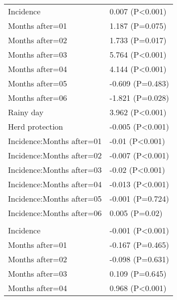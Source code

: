 \documentclass[]{article}
\begin{document}
\begin{longtable}[t]{ll}
\hspace{1em}Incidence & 0.007 (P<0.001)\\
\hspace{1em}Months after=01 & 1.187 (P=0.075)\\
\hspace{1em}Months after=02 & 1.733 (P=0.017)\\
\hspace{1em}Months after=03 & 5.764 (P<0.001)\\
\hspace{1em}Months after=04 & 4.144 (P<0.001)\\
\hspace{1em}Months after=05 & -0.609 (P=0.483)\\
\hspace{1em}Months after=06 & -1.821 (P=0.028)\\
\hspace{1em}Rainy day & 3.962 (P<0.001)\\
\hspace{1em}Herd protection & -0.005 (P<0.001)\\
\hspace{1em}Incidence:Months after=01 & -0.01 (P<0.001)\\
\hspace{1em}Incidence:Months after=02 & -0.007 (P<0.001)\\
\hspace{1em}Incidence:Months after=03 & -0.02 (P<0.001)\\
\hspace{1em}Incidence:Months after=04 & -0.013 (P<0.001)\\
\hspace{1em}Incidence:Months after=05 & -0.001 (P=0.724)\\
\hspace{1em}Incidence:Months after=06 & 0.005 (P=0.02)\\
\addlinespace[1.5em]
\multicolumn{2}{l}{\textbf{Temporary field worker}}\\
\hspace{1em}Incidence & -0.001 (P<0.001)\\
\hspace{1em}Months after=01 & -0.167 (P=0.465)\\
\hspace{1em}Months after=02 & -0.098 (P=0.631)\\
\hspace{1em}Months after=03 & 0.109 (P=0.645)\\
\hspace{1em}Months after=04 & 0.968 (P<0.001)\\

\end{longtable}
\end{document}
